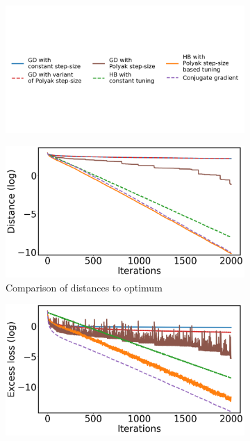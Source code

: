 \documentclass{article}
\begin{document}
    \begin{figure}[H]
        \centering
        \begin{subfigure}[c]{.9\textwidth}
            \centering
            \includegraphics[trim={0 6.5cm 0 7.5cm},clip, width=\linewidth]{figures/quad_long/kappa_100000_d_1000_legend.png}
        \end{subfigure}
        \begin{subfigure}[l]{.45\textwidth}
            \centering
            \includegraphics[width=\linewidth]{figures/quad_long/kappa_100000_d_1000_distances.png}
            \caption{Comparison of distances to optimum}
            \label{fig:quad_long_distances}
        \end{subfigure}
        \hspace{.2cm}
        \begin{subfigure}[r]{.45\textwidth}
            \centering
            \includegraphics[width=\linewidth]{figures/quad_long/kappa_100000_d_1000_losses.png}

\end{subfigure}
\end{figure}
\end{document}
